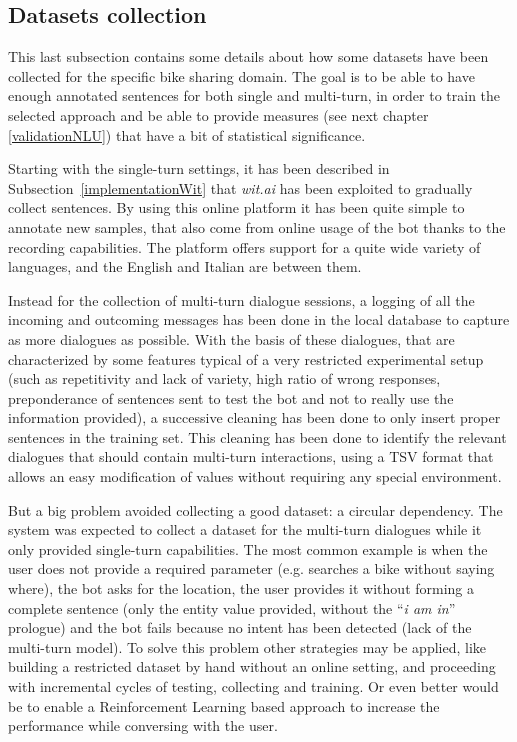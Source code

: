 \subsection{Datasets collection}
\label{implementationDatasets}

This last subsection contains some details about how some datasets have been collected for the specific bike sharing domain. The goal is to be able to have enough annotated sentences for both single and multi-turn, in order to train the selected approach and be able to provide measures (see next chapter \ref{validationNLU}) that have a bit of statistical significance.

Starting with the single-turn settings, it has been described in Subsection~\ref{implementationWit} that \textit{wit.ai} has been exploited to gradually collect sentences. By using this online platform it has been quite simple to annotate new samples, that also come from online usage of the bot thanks to the recording capabilities. The platform offers support for a quite wide variety of languages, and the English and Italian are between them.

Instead for the collection of multi-turn dialogue sessions, a logging of all the incoming and outcoming messages has been done in the local database to capture as more dialogues as possible. With the basis of these dialogues, that are characterized by some features typical of a very restricted experimental setup (such as repetitivity and lack of variety, high ratio of wrong responses, preponderance of sentences sent to test the bot and not to really use the information provided), a successive cleaning has been done to only insert proper sentences in the training set. This cleaning has been done to identify the relevant dialogues that should contain multi-turn interactions, using a TSV format that allows an easy modification of values without requiring any special environment.

But a big problem avoided collecting a good dataset: a circular dependency. The system was expected to collect a dataset for the multi-turn dialogues while it only provided single-turn capabilities. The most common example is when the user does not provide a required parameter (e.g. searches a bike without saying where), the bot asks for the location, the user provides it without forming a complete sentence (only the entity value provided, without the ``\textit{i am in}'' prologue) and the bot fails because no intent has been detected (lack of the multi-turn model). To solve this problem other strategies may be applied, like building a restricted dataset by hand without an online setting, and proceeding with incremental cycles of testing, collecting and training. Or even better would be to enable a Reinforcement Learning based approach to increase the performance while conversing with the user.
